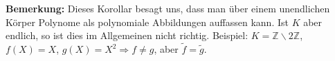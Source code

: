 \documentclass[11pt]{article}
\begin{document}
		\textbf{Bemerkung:} Dieses Korollar besagt uns, dass man \"uber einem unendlichen K\"orper Polynome als
		polynomiale Abbildungen auffassen kann. Ist $K$ aber endlich, so ist dies im Allgemeinen nicht richtig.
		Beispiel: $K=\mathbb Z\backslash 2\mathbb Z$, $f(X)=X$, $g(X)=X^2 \Rightarrow f \neq g$, aber 
		$\tilde f=\tilde g$.
\end{document}
